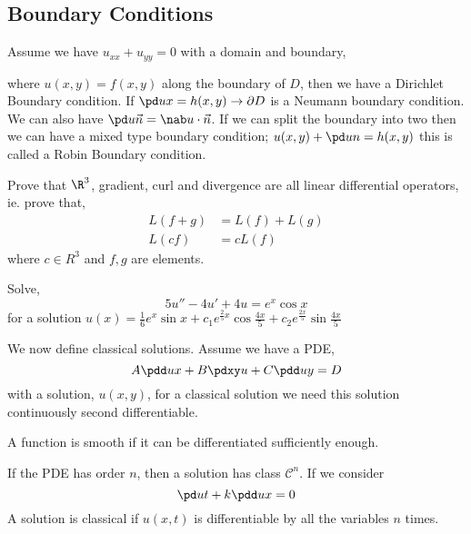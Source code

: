 \subsection{Boundary Conditions}
Assume we have $u_{xx} + u_{yy} = 0$ with a domain and boundary,

\begin{figure}[!ht]
\centering
{}
\end{figure}

where $u(x, y) = f(x, y)$ along the boundary of $D$, then we have a Dirichlet Boundary condition. If $\pd u x = h(x, y) \to \partial D$ is a Neumann boundary condition. We can also have $\pd u {\vec n} = \nab u \cdot \vec n$. If we can split the boundary into two then we can have a mixed type boundary condition; $u(x, y) + \pd u n = h(x, y)$ this is called a Robin Boundary condition.

\begin{exercise}
  Prove that $\R^3$, gradient, curl and divergence are all linear differential operators, ie. prove that,
  \begin{align*}
    L(f + g) &= L(f) + L(g)\\
    L(cf) &= cL(f)
  \end{align*}
  where $c \in R^3$ and $f, g$ are elements.
\end{exercise}
\begin{exercise}
  Solve,
  $$ 5u'' - 4u' + 4u = e^x\cos x $$
  for a solution $u(x) = \frac{1}{6}e^x\sin x + c_1e^{\frac{2}{5}x}\cos \frac{4x}{5} + c_2e^{\frac{2x}{5}}\sin \frac{4x}{5}$
\end{exercise}


We now define classical solutions. Assume we have a PDE,
$$ A\pdd u x + B\pdxy u + C\pdd u y = D $$
with a solution, $u(x, y)$, for a classical solution we need this solution continuously second differentiable.

\begin{ndefi}[Smooth]
  A function is smooth if it can be differentiated sufficiently enough.
\end{ndefi}

If the PDE has order $n$, then a solution has class $\mathcal{C}^n$. If we consider
$$ \pd u t + k\pdd u x = 0 $$
A solution is classical if $u(x, t)$ is differentiable by all the variables $n$ times.

